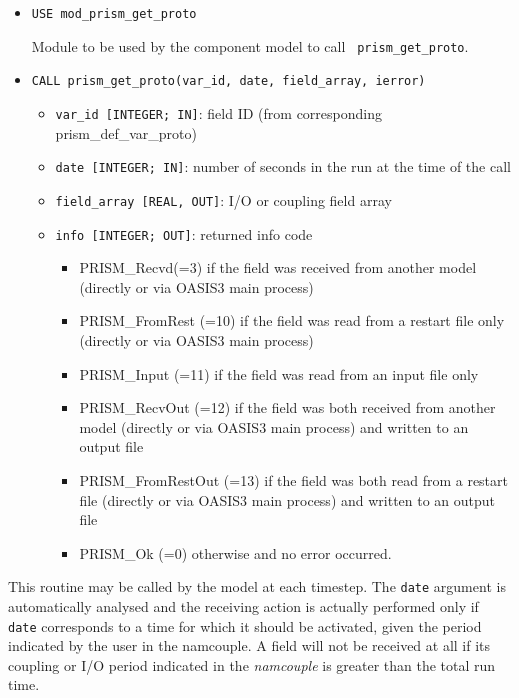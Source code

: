 \begin{itemize} 
\item {\tt USE  mod\_prism\_get\_proto}

Module to be used by the component model to call {\tt
  prism\_get\_proto}.
\item {\tt CALL prism\_get\_proto(var\_id, date, field\_array, ierror)}
\begin{itemize}
\item {\tt var\_id [INTEGER; IN]}: field ID (from
  corresponding prism\_def\_var\_proto)
\item {\tt date [INTEGER; IN]}: number of seconds in the run at the
time of the call
\item {\tt field\_array [REAL, OUT]}: I/O or coupling field array 
\item {\tt info [INTEGER; OUT]}: returned info code
   \begin{itemize} 
      \item PRISM\_Recvd(=3) if the field was received from another model
       (directly or via OASIS3 main process)
      \item PRISM\_FromRest (=10) if the field was read from a restart
       file only (directly or via OASIS3 main process)
      \item PRISM\_Input (=11) if the field was read from an input
       file only
      \item PRISM\_RecvOut (=12) if the field was both received from
       another model (directly or via OASIS3 main process) and written to
       an output file
      \item PRISM\_FromRestOut (=13) if the field was both read from a
       restart file (directly or via OASIS3 main process) and written to an
       output file
      \item PRISM\_Ok (=0) otherwise and no error occurred.
   \end{itemize}
\end{itemize}
\end{itemize}

This routine may be called by the model at each timestep. The {\tt date}
argument is automatically analysed and the receiving action is actually
performed only if {\tt date} corresponds to a time for which it should
be activated, given the period indicated by the user in the
namcouple. A field will not be received at all if its
coupling or I/O period indicated in the {\it namcouple} is greater
than the total run time.

